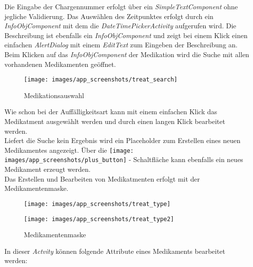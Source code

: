 Die Eingabe der Chargennummer erfolgt über ein \textit{SimpleTextComponent} ohne jegliche Validierung. Das Auswählen des Zeitpunktes erfolgt durch ein \textit{InfoObjComponent} mit dem die \textit{DateTimePickerActivity} aufgerufen wird. Die Beschreibung ist ebenfalls ein \textit{InfoObjComponent} und zeigt bei einem Klick einen einfachen \textit{AlertDialog} mit einem \textit{EditText} zum Eingeben der Beschreibung an. \\
Beim Klicken auf das \textit{InfoObjComponent} der Medikation wird die Suche mit allen vorhandenen Medikamenten geöffnet.
\begin{figure}[H]
	\centering
	\texttt{[image: images/app\_screenshots/treat\_search]}  
  \caption{Medikationsauswahl}
\end{figure}
Wie schon bei der Auffälligkeitsart kann mit einem einfachen Klick das Medikatment ausgewählt werden und durch einen langen Klick bearbeitet werden. \\
Liefert die Suche kein Ergebnis wird ein Placeholder zum Erstellen eines neuen Medikamentes angezeigt. Über die \texttt{[image: images/app\_screenshots/plus\_button]} - Schaltfläche kann ebenfalls ein neues Medikament erzeugt werden. \\
Das Erstellen und Bearbeiten von Medikatmenten erfolgt mit der Medikamentenmaske.
\begin{figure}[H]
  \centering
  \begin{minipage}[t]{7 cm}
  	\centering
  	\texttt{[image: images/app\_screenshots/treat\_type]} 
  \end{minipage}
  \hspace{0.5cm}
  \begin{minipage}[t]{7 cm}
	\centering
	\texttt{[image: images/app\_screenshots/treat\_type2]}  
  \end{minipage}
  \caption{Medikamentenmaske}
\end{figure}
In dieser \textit{Actvity} können folgende Attribute eines Medikaments bearbeitet werden:
